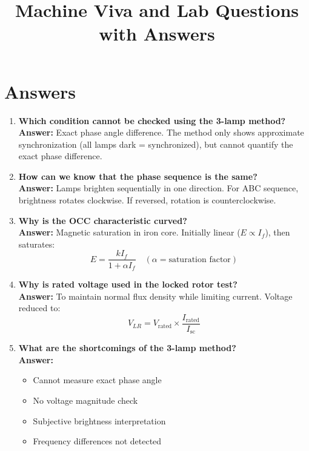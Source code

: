 \documentclass[12pt,a4paper]{article}
\title{\textbf{Machine Viva and Lab Questions with Answers}}
\author{}
\date{}
\begin{document}
	
	\maketitle
	\onehalfspacing
	
	\section*{Answers}
	
	\begin{enumerate}
		\item \textbf{Which condition cannot be checked using the 3-lamp method?} \\
		\textbf{Answer:} Exact phase angle difference. The method only shows approximate synchronization (all lamps dark = synchronized), but cannot quantify the exact phase difference.
		
		\item \textbf{How can we know that the phase sequence is the same?} \\
		\textbf{Answer:} Lamps brighten sequentially in one direction. For ABC sequence, brightness rotates clockwise. If reversed, rotation is counterclockwise.
		
		\item \textbf{Why is the OCC characteristic curved?} \\
		\textbf{Answer:} Magnetic saturation in iron core. Initially linear ($E \propto I_f$), then saturates:
		\[
		E = \frac{kI_f}{1 + \alpha I_f} \quad (\alpha = \text{saturation factor})
		\]
		
		\item \textbf{Why is rated voltage used in the locked rotor test?} \\
		\textbf{Answer:} To maintain normal flux density while limiting current. Voltage reduced to:
		\[
		V_{LR} = V_{\text{rated}} \times \frac{I_{\text{rated}}}{I_{\text{sc}}}
		\]
		
		\item \textbf{What are the shortcomings of the 3-lamp method?} \\
		\textbf{Answer:} 
		\begin{itemize}
			\item Cannot measure exact phase angle
			\item No voltage magnitude check
			\item Subjective brightness interpretation
			\item Frequency differences not detected
		\end{itemize}
		

\end{enumerate}
\end{document}
